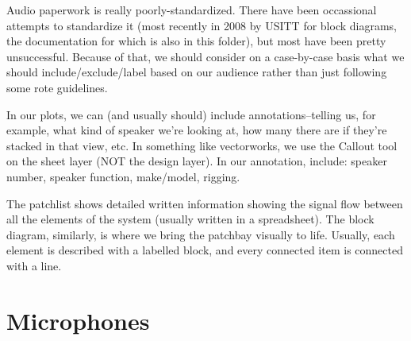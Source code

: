 \documentclass[a4paper]{article}
\begin{document}
Audio paperwork is really poorly-standardized. There have been occassional
attempts to standardize it (most recently in 2008 by USITT for block diagrams,
the documentation for which is also in this folder),
but most have been pretty unsuccessful. Because of that, we should consider on
a case-by-case basis what we should include/exclude/label based on our audience
rather than just following some rote guidelines.

In our plots, we can (and usually should) include annotations--telling us, for
example, what kind of speaker we're looking at, how many there are if they're
stacked in that view, etc. In something like vectorworks, we use the Callout
tool on the sheet layer (NOT the design layer). In our annotation, include:
speaker number, speaker function, make/model, rigging.

The patchlist shows detailed written information showing the signal flow
between all the elements of the system (usually written in a spreadsheet). The
block diagram, similarly, is where we bring the patchbay visually to life.
Usually, each element is described with a labelled block, and every connected
item is connected with a line.

\section{Microphones}
\end{document}
